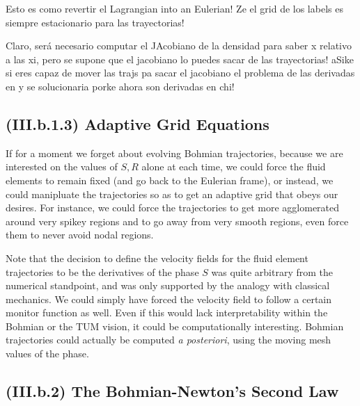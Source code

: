 \documentclass[11pt, a4paper]{article} %
\begin{document}
Esto es como revertir el Lagrangian into an Eulerian! Ze el grid de los labels es siempre estacionario para las trayectorias! 

Claro, será necesario computar el JAcobiano de la densidad para saber x relativo a las xi, pero se supone que el jacobiano lo puedes sacar de las trayectorias! aSike si eres capaz de mover las trajs pa sacar el jacobiano el problema de las derivadas en y se solucionaria porke ahora son derivadas en chi!

\subsection*{(III.b.1.3) Adaptive Grid Equations}

If for a moment we forget about evolving Bohmian trajectories, because we are interested on the values of $S,R$ alone at each time, we could force the fluid elements to remain fixed (and go back to the Eulerian frame), or instead, we could manipluate the trajectories so as to get an adaptive grid that obeys our desires. For instance, we could force the trajectories to get more agglomerated around very spikey regions and to go away from very smooth regions, even force them to never avoid nodal regions.

Note that the decision to define the velocity fields for the fluid element trajectories to be the derivatives of the phase $S$ was quite arbitrary from the numerical standpoint, and was only supported by the analogy with classical mechanics. We could  simply have forced the velocity field to follow a certain monitor function as well. Even if this would lack interpretability within the Bohmian or the TUM vision, it could be computationally interesting. Bohmian trajectories could actually be computed {\em a posteriori}, using the moving mesh values of the phase.


\subsection*{(III.b.2) The Bohmian-Newton's Second Law}
\end{document}
